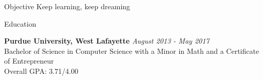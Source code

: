 \documentclass{resume} %
\begin{document}
\center

\begin{rSection}{Objective}
Keep learning, keep dreaming
\end{rSection}
\begin{rSection}{Education}

{\bf Purdue University, West Lafayette} \hfill {\em August 2013 - May 2017} \\ 
Bachelor of Science in Computer Science with a Minor in Math and a Certificate of Entrepreneur \\
Overall GPA: 3.71/4.00

\end{rSection}

\end{document}
